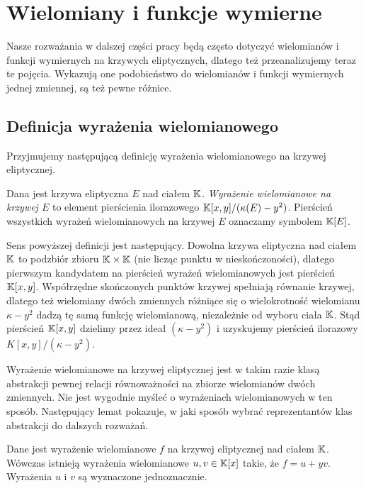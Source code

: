 \section{Wielomiany i funkcje wymierne}

Nasze rozważania w dalszej części pracy
będą często dotyczyć
wielomianów i funkcji wymiernych na krzywych eliptycznych,
dlatego też przeanalizujemy teraz te pojęcia.
Wykazują one podobieństwo do wielomianów i funkcji wymiernych jednej zmiennej,
są też pewne różnice.

\subsection*{Definicja wyrażenia wielomianowego}

Przyjmujemy następującą definicję
wyrażenia wielomianowego na krzywej eliptycznej.

\begin{definition}
Dana jest krzywa eliptyczna $E$ nad ciałem $\mathbb{K}$.
\emph{Wyrażenie wielomianowe na krzywej $E$}
to element pierścienia ilorazowego
$\mathbb{K}[x,y]/(\kappa(E) - y^2)$.
Pierścień wszystkich wyrażeń wielomianowych na krzywej $E$
oznaczamy symbolem $\mathbb{K}[E]$.
\end{definition}

Sens powyższej definicji jest następujący.
Dowolna krzywa eliptyczna nad ciałem $\mathbb{K}$ to podzbiór zbioru $\mathbb{K} \times \mathbb{K}$
(nie licząc punktu w nieskończoności),
dlatego pierwszym kandydatem na pierścień wyrażeń wielomianowych
jest pierścień $\mathbb{K}[x,y]$.
Współrzędne skończonych punktów krzywej spełniają równanie krzywej,
dlatego też wielomiany dwóch zmiennych różniące się
o wielokrotność wielomianu $\kappa- y^2$
dadzą tę samą funkcję wielomianową,
niezależnie od wyboru ciała $\mathbb{K}$.
Stąd pierścień $\mathbb{K}[x,y]$ dzielimy przez ideał $(\kappa- y^2)$
i uzyskujemy pierścień ilorazowy $K[x,y]/(\kappa - y^2)$.

Wyrażenie wielomianowe na krzywej eliptycznej
jest w takim razie klasą abstrakcji
pewnej relacji równoważności na zbiorze wielomianów dwóch zmiennych.
Nie jest wygodnie myśleć o wyrażeniach wielomianowych w ten sposób.
Następujący lemat pokazuje,
w jaki sposób wybrać reprezentantów klas abstrakcji
do dalszych rozważań.

\begin{theorem}
Dane jest wyrażenie wielomianowe $f$ na krzywej eliptycznej nad ciałem $\mathbb{K}$.
Wówczas istnieją wyrażenia wielomianowe $u, v \in \mathbb{K}[x]$ takie,
że $f = u + yv$.
Wyrażenia $u$ i $v$ są wyznaczone jednoznacznie.
\end{theorem}


